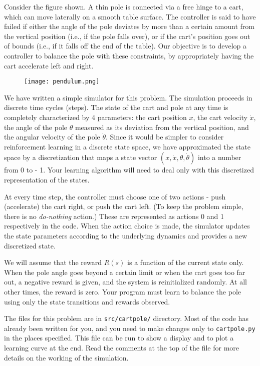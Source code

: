 \documentclass{article}
\begin{document}
Consider the figure shown. A thin pole is connected via a free hinge to a cart, which can move laterally on a smooth table surface. The controller is said to have failed if either the angle of the pole deviates by more than a certain amount from the vertical position (i.e., if the pole falls over), or if the cart’s position goes out of bounds (i.e., if it falls off the end of the table). Our objective is to develop a controller to balance the pole with these constraints, by appropriately having the cart accelerate left and right.
\begin{figure}[H]
    \centering
    \texttt{[image: pendulum.png]}
    \label{fig:pendulum}
\end{figure}
We have written a simple simulator for this problem. The simulation proceeds in discrete time cycles (steps). The state of the cart and pole at any time is completely characterized by 4 parameters: the cart position \(x\), the cart velocity \(\dot{x}\), the angle of the pole \(\theta\) measured as its deviation from the vertical position, and the angular velocity of the pole \(\dot{\theta}\). Since it would be simpler to consider reinforcement learning in a discrete state space, we have approximated the state space by a discretization that maps a state vector \((x, \dot{x}, \theta, \dot{\theta})\) into a number from 0 to  - 1. Your learning algorithm will need to deal only with this discretized representation of the states.

At every time step, the controller must choose one of two actions - push (accelerate) the cart right, or push the cart left. (To keep the problem simple, there is no \textit{do-nothing} action.) These are represented as actions 0 and 1 respectively in the code. When the action choice is made, the simulator updates the state parameters according to the underlying dynamics and provides a new discretized state.

We will assume that the reward \(R(s)\) is a function of the current state only. When the pole angle goes beyond a certain limit or when the cart goes too far out, a negative reward is given, and the system is reinitialized randomly. At all other times, the reward is zero. Your program must learn to balance the pole using only the state transitions and rewards observed.

The files for this problem are in \texttt{src/cartpole/} directory. Most of the code has already been written for you, and you need to make changes only to \texttt{cartpole.py} in the places specified. This file can be run to show a display and to plot a learning curve at the end. Read the comments at the top of the file for more details on the working of the simulation.
\end{document}
